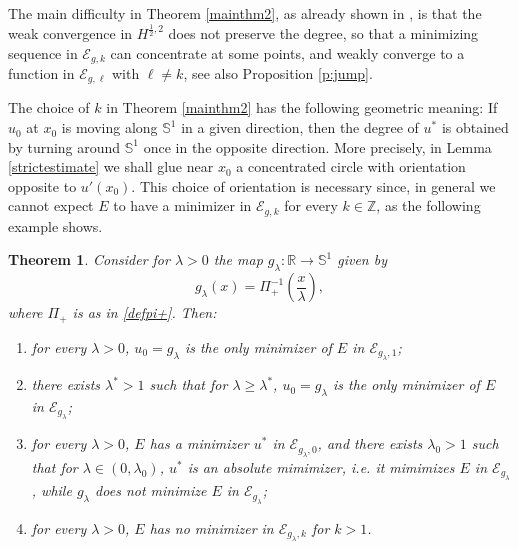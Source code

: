 \documentclass[12pt, a4paper]{article}
\newtheorem{thm}{Theorem}[section]
\newcommand{\M}[1]{\mathcal{#1}}
\newcommand{\sph}{\mathbb{S}}
\newcommand{\R}{\mathbb{R}}
\newcommand{\blu}[1]{{\color{blue}#1}}
\renewcommand{\(}{\left(}
\renewcommand{\)}{\right)}
\begin{document}
The main difficulty in Theorem \ref{mainthm2}, as already shown in \cite{mirpis}, is that the weak convergence in $H^{\frac12,2}$ does not preserve the degree, so that a minimizing sequence in $\M{E}_{g,k}$ can concentrate at some points, and  weakly converge to a function in $\M{E}_{g,\ell}$ with $\ell\ne k$, see also Proposition  \ref{p:jump}.

The choice of $k$ in Theorem \ref{mainthm2} has the following geometric meaning: If $u_0$ at $x_0$ is moving along $\sph^1$ in a given direction, then the degree of $u^*$  is obtained by turning around $\sph^1$ once in the opposite direction. More precisely, in Lemma \ref{strictestimate} we shall glue near $x_0$ a concentrated circle with orientation opposite to $u'(x_0)$. This choice of orientation is necessary since, in general we cannot expect $E$ to have a minimizer in $\M{E}_{g,k}$ for every $k\in\mathbb{Z}$, as the following example shows.

\begin{thm}\label{thmex}
Consider for $\lambda>0$ the map $g_\lambda:\R\to \sph^1$ given by
\begin{equation}\label{defglambda}
g_\lambda(x)=\Pi_+^{-1}\left(\frac{x}{\lambda}\right),
\end{equation}
where $\Pi_+$ is as in \eqref{defpi+}.
Then:
\begin{enumerate}
\item[(i)] for every $\lambda>0$, $u_0=g_\lambda$ is the only minimizer of $E$ in $\M{E}_{g_\lambda,1}$;
\item[(ii)] there exists $\lambda^*>1$ such that for $\lambda\ge \lambda^*$, $u_0=g_\lambda$ is the only minimizer of $E$ in $\M{E}_{g_\lambda}$;
\item[(iii)] for every $\lambda>0$, $E$ has a minimizer $u^*$ in $\M{E}_{g_\lambda,0}$, and there exists $\lambda_0>1$ such that for $\lambda\in (0,\lambda_0)$, $u^*$ is an absolute mimimizer, i.e. it mimimizes $E$ in $\M{E}_{g_\lambda}$, while $g_\lambda$ does not minimize $E$ in $\M{E}_{g_\lambda}$;
\item[(iv)] for every $\lambda>0$, $E$ has no minimizer in $\M{E}_{g_\lambda,k}$ for $k>1$.
\end{enumerate}
\end{thm}

\end{document}

